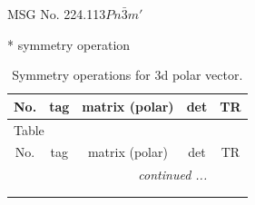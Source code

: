 \documentclass[fleqn,8pt]{jsarticle}
\begin{document}
\setcounter{MaxMatrixCols}{32}

\renewcommand{\tablename}{Table~}
\renewcommand{\figurename}{Figure~}
\begin{center}
\LARGE
MSG No. 224.113\quad$Pn\bar{3}m'$
\end{center}
* symmetry operation
\renewcommand{\arraystretch}{1.3}
\begin{longtable}{ccccc}
\caption{Symmetry operations for 3d polar vector.}
 \\
 \hline \hline
No. & tag & matrix (polar) & det & TR \\ \hline \endfirsthead

\multicolumn{4}{l}{\tablename\ \thetable{}} \\
 \hline \hline
No. & tag & matrix (polar) & det & TR \\ \hline \endhead

 \hline \hline
\multicolumn{4}{r}{\footnotesize\it continued ...} \\ \endfoot

 \hline \hline
\multicolumn{4}{r}{} \\ \endlastfoot


\end{longtable}
\end{document}
